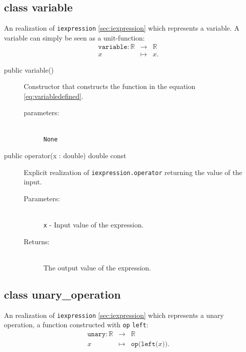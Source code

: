 \documentclass[a4paper,11pt]{kth-mag}
\newcommand{\RR}{\ensuremath{\mathbb{R}}}
\begin{document}
\subsection{class variable} An realization of \texttt{iexpression}
\ref{sec:iexpression} which represents a variable. A variable can simply be
seen as a unit-function:
\begin{eqnarray}
    \label{eq:variabledefined}
    \texttt{variable}: \RR &\rightarrow& \RR \nonumber \\
    x &\mapsto& x .
\end{eqnarray}
\begin{description}
    \item[public variable()] Constructor 
    that constructs the function in the equation \ref{eq:variabledefined}. 
    \begin{description}
        \item[parameters:]~\\
            \verb+None+
    \end{description}
\end{description}
\begin{description}
    \item[public operator(x : double) double const] 
    Explicit realization of \texttt{iexpression.operator} returning the value
    of the input.
    \begin{description}
        \item[Parameters:]~\\
            \verb+x+ - Input value of the expression.
        \item[Returns:]~\\
            The output value of the expression.
    \end{description}
\end{description}


\subsection{class unary\_operation} An realization of \texttt{iexpression}
\ref{sec:iexpression} which represents a unary operation, a function
constructed with \texttt{op} \texttt{left}:
\begin{eqnarray}
    \label{eq:unarydefined}
    \texttt{unary}:\RR &\rightarrow& \RR \nonumber \\
    x &\mapsto& \texttt{op(left(}x\texttt{))}. 
\end{eqnarray}
\end{document}
